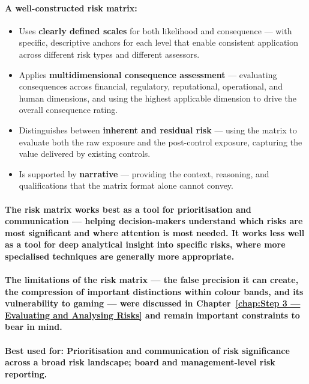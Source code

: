 \paragraph{A well-constructed risk matrix:}
\begin{itemize}
    \item{Uses \textbf{clearly defined scales} for both likelihood and consequence — with specific, descriptive anchors for each level that enable consistent application across different risk types and different assessors.}
    \item{Applies \textbf{multidimensional consequence assessment} — evaluating consequences across financial, regulatory, reputational, operational, and human dimensions, and using the highest applicable dimension to drive the overall consequence rating.}
    \item{Distinguishes between \textbf{inherent and residual risk} — using the matrix to evaluate both the raw exposure and the post-control exposure, capturing the value delivered by existing controls.}
    \item{Is supported by \textbf{narrative} — providing the context, reasoning, and qualifications that the matrix format alone cannot convey.}
\end{itemize}
\paragraph{The risk matrix works best as a tool for \textbf{prioritisation and communication} — helping decision-makers understand which risks are most significant and where attention is most needed. It works less well as a tool for deep analytical insight into specific risks, where more specialised techniques are generally more appropriate.}
\paragraph{The limitations of the risk matrix — the false precision it can create, the compression of important distinctions within colour bands, and its vulnerability to gaming — were discussed in Chapter~\ref{chap:Step 3 — Evaluating and Analysing Risks} and remain important constraints to bear in mind.}
\paragraph{\textbf{Best used for}: Prioritisation and communication of risk significance across a broad risk landscape; board and management-level risk reporting.}
